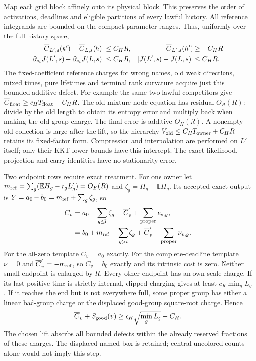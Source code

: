 Map each grid block affinely onto its physical block. This preserves
the order of activations, deadlines and eligible partitions of every
lawful history. All reference integrands are bounded on the compact
parameter ranges. Thus, uniformly over the full history space,
\begin{align}
 |\overline C_{L',s}(h')-\overline C_{L,s}(h)|&\leq C_HR,
 &\overline C_{L',s}(h')&\geq-C_HR,\notag\\
 |\partial_{s_i}J(L',s)-\partial_{s_i}J(L,s)|&\leq C_HR,
 &|J(L',s)-J(L,s)|&\leq C_HR.
 \label{arithdetail:bounded-defects}
\end{align}
The fixed-coefficient reference charges for wrong names, old weak
directions, mixed times, pure lifetimes and terminal rank curvature
acquire just this bounded additive defect. For example the same two
lawful competitors give
$\overline C_{\rm float}\geq c_HT_{\rm float}-C_HR$.
The old-mixture node equation has residual $O_H(R)$: divide by the
old length to obtain its entropy error and multiply back when making
the old-group charge. The final error is additive $O_H(R)$.
A nonempty old collection is large after the lift, so the hierarchy
$V_{\rm old}\leq C_HT_{\rm owner}+C_HR$ retains its fixed-factor
form. Compression and interpolation are performed on $L'$ itself;
only their KKT lower bounds have this intercept. The exact likelihood,
projection and carry identities have no stationarity error.

Two endpoint rows require exact treatment. For one owner let
$m_{\rm ref}=\sum_g(\mathbb EH_g-r_gL_g')=O_H(R)$ and
$\zeta_g=H_g-\mathbb EH_g$. Its accepted exact output is
$Y=a_0-b_0=m_{\rm ref}+\sum_g\zeta_g$, so
\begin{align}
 C_v&=a_0-\sum_{g\leq l}\zeta_g+\overline C_v'
                         +\sum_{\rm proper}\nu_{v,g},\notag\\
 &=b_0+m_{\rm ref}+\sum_{g>l}\zeta_g+\overline C_v'
                         +\sum_{\rm proper}\nu_{v,g}.
 \label{arithdetail:exact-grid-endpoints}
\end{align}
For the all-zero template $C_v=a_0$ exactly. For the complete-deadline
template $\nu=0$ and $\overline C_v'=-m_{\rm ref}$, so $C_v=b_0$
exactly and its intrinsic cost is zero. Neither small endpoint is
enlarged by $R$.
Every other endpoint has an own-scale charge. If its last positive
time is strictly internal, clipped charging gives at least
$c_H\min_gL_g$. If it reaches the end but is not everywhere full,
some proper group has either a linear bad-group charge or the displaced
good-group square-root charge. Hence
\begin{equation}
 \overline C_v+S_{\rm good}(v)
 \geq c_H\sqrt{\min_gL_g}-C_H.
 \label{arithdetail:nonexceptional-charge}
\end{equation}
The chosen lift absorbs all bounded defects within the already
reserved fractions of these charges. The displaced named box is
retained; central uncolored counts alone would not imply this step.

